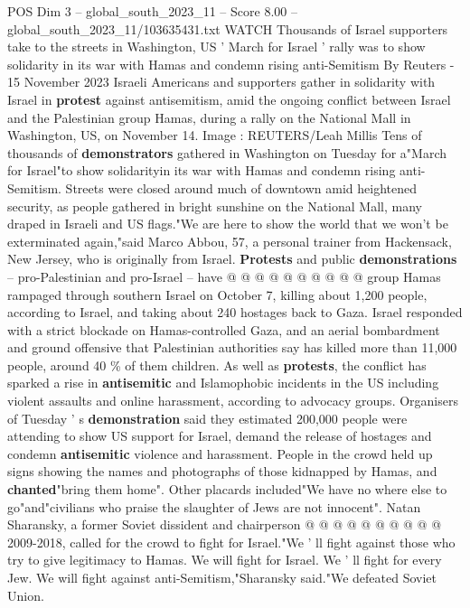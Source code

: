 \begin{textsample}{POS Dim 3 – global\_south\_2023\_11 – Score 8.00 – global\_south\_2023\_11/103635431.txt}  \label{ex:f3_pos_378}
WATCH Thousands of Israel supporters take to the streets in Washington, US ' March for Israel ' rally was to show solidarity in its war with Hamas and condemn rising anti-Semitism By Reuters - 15 November 2023 Israeli Americans and supporters gather in solidarity with Israel in \textbf{protest} against antisemitism, amid the ongoing conflict between Israel and the Palestinian group Hamas, during a rally on the National Mall in Washington, US, on November 14.
Image : REUTERS/Leah Millis Tens of thousands of \textbf{demonstrators} gathered in Washington on Tuesday for a"March for Israel"to show solidarityin its war with Hamas and condemn rising anti-Semitism.
Streets were closed around much of downtown amid heightened security, as people gathered in bright sunshine on the National Mall, many draped in Israeli and US flags."We are here to show the world that we won't be exterminated again,"said Marco Abbou, 57, a personal trainer from Hackensack, New Jersey, who is originally from Israel. \textbf{Protests} and public \textbf{demonstrations} -- pro-Palestinian and pro-Israel -- have @ @ @ @ @ @ @ @ @ @ group Hamas rampaged through southern Israel on October 7, killing about 1,200 people, according to Israel, and taking about 240 hostages back to Gaza.
Israel responded with a strict blockade on Hamas-controlled Gaza, and an aerial bombardment and ground offensive that Palestinian authorities say has killed more than 11,000 people, around 40 \% of them children.
As well as \textbf{protests}, the conflict has sparked a rise in \textbf{antisemitic} and Islamophobic incidents in the US including violent assaults and online harassment, according to advocacy groups.
Organisers of Tuesday ' s \textbf{demonstration} said they estimated 200,000 people were attending to show US support for Israel, demand the release of hostages and condemn \textbf{antisemitic} violence and harassment.
People in the crowd held up signs showing the names and photographs of those kidnapped by Hamas, and \textbf{chanted}"bring them home".
Other placards included"We have no where else to go"and"civilians who praise the slaughter of Jews are not innocent".
Natan Sharansky, a former Soviet dissident and chairperson @ @ @ @ @ @ @ @ @ @ 2009-2018, called for the crowd to fight for Israel."We ' ll fight against those who try to give legitimacy to Hamas.
We will fight for Israel.
We ' ll fight for every Jew.
We will fight against anti-Semitism,"Sharansky said."We defeated Soviet Union.

\end{textsample}
